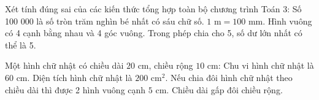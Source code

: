 \begin{ex} %
Xét tính đúng sai của các kiến thức tổng hợp toàn bộ chương trình Toán 3:
\choiceTF
{\True Số 100 000 là số tròn trăm nghìn bé nhất có sáu chữ số.}
{$1\text{ m} = 100\text{ mm}$.}
{\True Hình vuông có 4 cạnh bằng nhau và 4 góc vuông.}
{Trong phép chia cho 5, số dư lớn nhất có thể là 5.}
\end{ex}

\begin{ex} %
Một hình chữ nhật có chiều dài $20\text{ cm}$, chiều rộng $10\text{ cm}$:
\choiceTF
{\True Chu vi hình chữ nhật là $60\text{ cm}$.}
{\True Diện tích hình chữ nhật là $200\text{ cm}^2$.}
{Nếu chia đôi hình chữ nhật theo chiều dài thì được 2 hình vuông cạnh $5\text{ cm}$.}
{\True Chiều dài gấp đôi chiều rộng.}
\end{ex}

